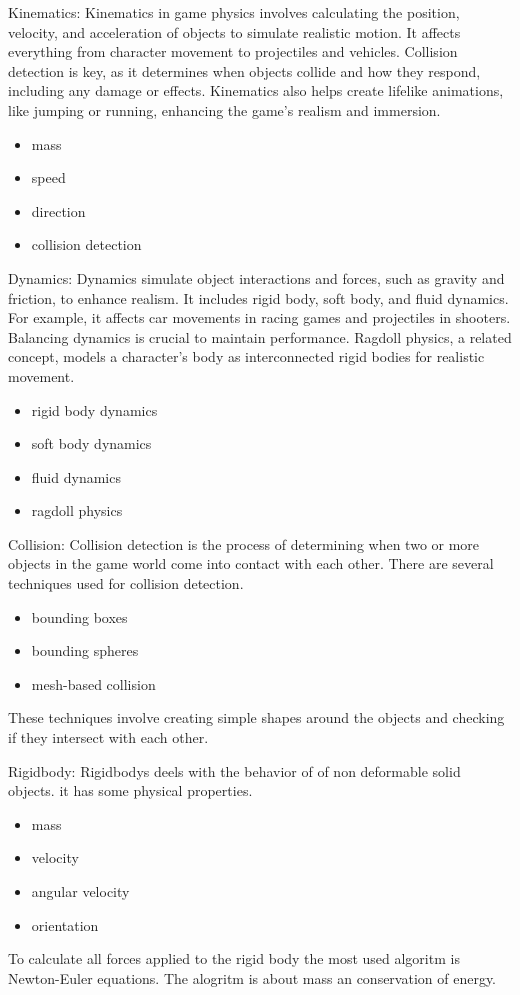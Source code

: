 \documentclass{projdoc}
\begin{document}

Kinematics:
Kinematics in game physics involves calculating the position, velocity, and acceleration of objects to simulate realistic motion. It affects everything from character movement to projectiles and vehicles. Collision detection is key, as it determines when objects collide and how they respond, including any damage or effects. Kinematics also helps create lifelike animations, like jumping or running, enhancing the game's realism and immersion.
\begin{itemize}
	\item mass
	\item speed
	\item direction
	\item collision detection
\end{itemize}


Dynamics:
Dynamics simulate object interactions and forces, such as gravity and friction, to enhance realism. It includes rigid body, soft body, and fluid dynamics. For example, it affects car movements in racing games and projectiles in shooters. Balancing dynamics is crucial to maintain performance. Ragdoll physics, a related concept, models a character’s body as interconnected rigid bodies for realistic movement.
\begin{itemize}
	\item rigid body dynamics
	\item soft body dynamics
	\item fluid dynamics
	\item ragdoll physics
\end{itemize}


Collision:
Collision detection is the process of determining when two or more objects in the game world come into contact with each other. There are several techniques used for collision detection.
\begin{itemize}
	\item bounding boxes
	\item bounding spheres
	\item mesh-based collision
\end{itemize}
These techniques involve creating simple shapes around the objects and checking if they intersect with each other.

Rigidbody:
Rigidbodys deels with the behavior of of non deformable solid objects. it has some physical properties.
\begin{itemize}
	\item mass
	\item velocity
	\item angular velocity
	\item orientation
\end{itemize}
To calculate all forces applied to the rigid body the most used algoritm is Newton-Euler equations. The alogritm is about mass an conservation of energy.
\end{document}
